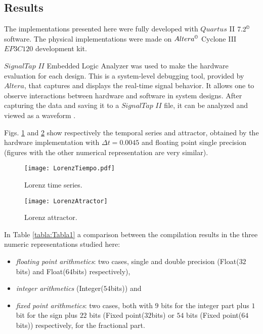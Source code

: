 \subsection{Results}
\label{sec:resultados}

The implementations presented here were fully developed with $Quartus$ II $7.2^\copyright$ software.
The physical implementations were made on $Altera^\copyright$ Cyclone III $EP3C120$ development kit.

$SignalTap$ $II$ Embedded Logic Analyzer was used to make the hardware evaluation for each design.
This is a system-level debugging tool, provided by $Altera$,  that captures and displays the real-time signal behavior.
It allows  one to observe interactions between hardware and software in system designs.
After capturing the data and saving it to a $SignalTap$ $II$ file, it can be analyzed and viewed as a waveform \cite{QUARTUS}.

Figs. \ref{fig:tiempo} and \ref{fig:atractor} show respectively the temporal series and attractor, obtained by the hardware implementation with $\Delta t=0.0045$ and floating point single precision (figures with the other numerical representation are very similar).
%
\begin{figure}
	\centering
	\texttt{[image: LorenzTiempo.pdf]}\\
	\caption{Lorenz time series.}\label{fig:tiempo}
\end{figure}
%
\begin{figure}
	\centering
	\texttt{[image: LorenzAtractor]}\\
	\caption{Lorenz attractor.}\label{fig:atractor}
\end{figure}

In Table \ref{tabla:Tabla1} a comparison between the compilation results in the three numeric representations studied here:
\begin{itemize}
\item \textit{floating point arithmetics}: two cases, single and double precision (Float($32$bits) and Float($64$bits) respectively),
\item \textit{integer arithmetics} (Integer($54$bits)) and
\item \textit{fixed point arithmetics}: two cases, both with   $9$ bits for the integer part plus $1$ bit for the sign plus $22$ bits  (Fixed point($32$bits) or $54$ bits (Fixed point($64$bits)) respectively, for the fractional part.
\end{itemize}

